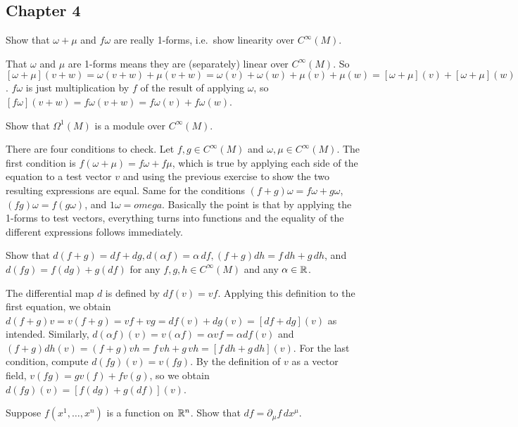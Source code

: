 \subsection{Chapter 4}
\begin{p}
{Show that $\omega+\mu$ and $f\omega$ are really 1-forms, i.e.\ show linearity over $C^\infty(M)$.}
\end{p}

That $\omega$ and $\mu$ are 1-forms means they are (separately) linear over $C^\infty(M)$. So $[\omega+\mu](v+w)=
\omega(v+w)+\mu(v+w)=\omega(v)+\omega(w)+\mu(v)+\mu(w)=[\omega+\mu](v)+[\omega+\mu](w)$. $f\omega$ is just
multiplication by $f$ of the result of applying $\omega$, so $[f\omega](v+w)=f\omega(v+w)=f\omega(v)+f\omega(w)$.

\begin{p}{Show that $\Omega^1(M)$ is a module over $C^\infty(M)$.}
\end{p}

There are four conditions to check. Let $f,g\in C^\infty(M)$ and $\omega,\mu\in C^\infty(M)$. The first condition
is $f(\omega+\mu)=f\omega+f\mu$, which is true by applying each side of the equation to a test vector $v$ and
using the previous exercise to show the two resulting expressions are equal. Same for the conditions $(f+g)\omega=f\omega+g\omega$,
$(fg)\omega=f(g\omega)$, and $1\omega=omega$. Basically the point is that by applying the 1-forms to test vectors, everything
turns into functions and the equality of the different expressions follows immediately.\\

\begin{p}
{Show that $d(f+g)=df+dg, d(\alpha f)=\alpha\, df, (f+g)dh=f\,dh+g\,dh$, and $d(fg)=f(dg)+g(df)$ for any
$f,g,h\in C^\infty(M)$ and any $\alpha\in \mathbb{R}$.}
\end{p}

The differential map $d$ is defined by $df(v)=vf$. Applying this definition to the first equation, we obtain $d(f+g)v=v(f+g)=vf+vg=df(v)+dg(v)=[df+dg](v)$ as intended. Similarly, $d(\alpha f)(v)=v(\alpha f)=\alpha vf=\alpha df(v)$
and $(f+g)dh(v)=(f+g)vh=f\,vh+g\,vh=[f\,dh+g\,dh](v)$. For the last condition, compute $d(fg)(v)=v(fg).$ By the definition
of $v$ as a vector field, $v(fg)=gv(f)+fv(g)$, so we obtain $d(fg)(v)=[f(dg)+g(df)](v)$.\\

\begin{p}{Suppose $f(x^1,\dots,x^n)$ is a function on $\mathbb{R}^n$. Show that $df=\partial_\mu f\,dx^\mu$.}
\end{p}

